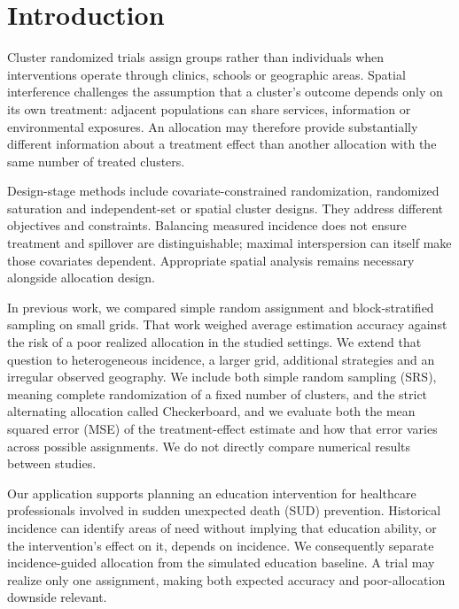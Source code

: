 \documentclass[Afour,sagev,times]{sagej}
\begin{document}
\section{Introduction}
Cluster randomized trials assign groups rather than individuals when interventions operate through clinics, schools or geographic areas.\cite{donner_design_2000,hayes_cluster_2017} Spatial interference challenges the assumption that a cluster's outcome depends only on its own treatment: adjacent populations can share services, information or environmental exposures.\cite{hudgens_toward_2008,jarvis_spatial_2017} An allocation may therefore provide substantially different information about a treatment effect than another allocation with the same number of treated clusters.

Design-stage methods include covariate-constrained randomization, randomized saturation and independent-set or spatial cluster designs.\cite{crisp_covariate-constrained_2023,baird_optimal_2018,cai_independentset_2023,leung_rateoptimal_2022} They address different objectives and constraints. Balancing measured incidence does not ensure treatment and spillover are distinguishable; maximal interspersion can itself make those covariates dependent. Appropriate spatial analysis remains necessary alongside allocation design.

In previous work, we compared simple random assignment and block-stratified sampling on small grids.\cite{walther_spatialcrt_2026} That work weighed average estimation accuracy against the risk of a poor realized allocation in the studied settings. We extend that question to heterogeneous incidence, a larger grid, additional strategies and an irregular observed geography. We include both simple random sampling (SRS), meaning complete randomization of a fixed number of clusters, and the strict alternating allocation called Checkerboard, and we evaluate both the mean squared error (MSE) of the treatment-effect estimate and how that error varies across possible assignments. We do not directly compare numerical results between studies.

Our application supports planning an education intervention for healthcare professionals involved in sudden unexpected death (SUD) prevention. Historical incidence can identify areas of need without implying that education ability, or the intervention's effect on it, depends on incidence. We consequently separate incidence-guided allocation from the simulated education baseline. A trial may realize only one assignment, making both expected accuracy and poor-allocation downside relevant.
\end{document}
